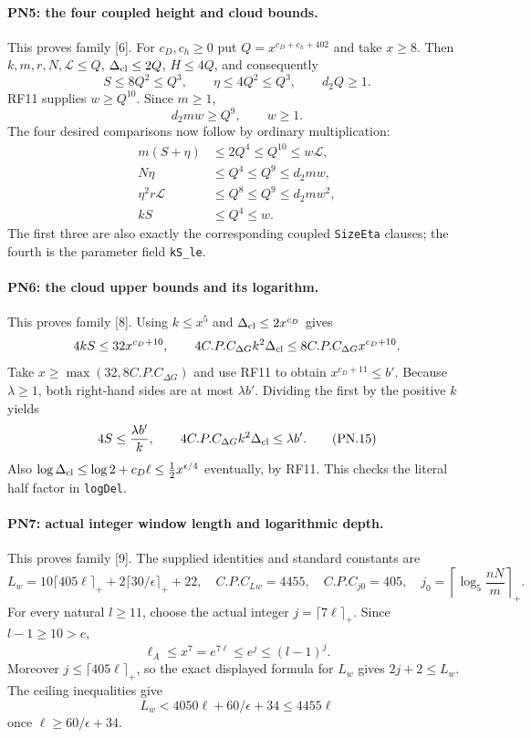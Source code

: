 \paragraph{PN5: the four coupled height and cloud bounds.}
This proves family [6]. For $c_D,c_h\geq0$ put
$Q=x^{c_D+c_h+402}$ and take $x\geq8$.
Then $k,m,r,N,\mathcal L\leq Q$, $\Delta_{\rm cl}\leq2Q$,
$H\leq4Q$, and consequently
\[
 S\leq8Q^2\leq Q^3,\qquad
 \eta\leq4Q^2\leq Q^3,\qquad d_2Q\geq1.
\]
RF11 supplies $w\geq Q^{10}$. Since $m\geq1$,
\[
 d_2mw\geq Q^9,\qquad w\geq1.
\]
The four desired comparisons now follow by ordinary multiplication:
\begin{align*}
 m(S+\eta)&\leq2Q^4\leq Q^{10}\leq w\mathcal L,\\
 N\eta&\leq Q^4\leq Q^9\leq d_2mw,\\
 \eta^2r\mathcal L&\leq Q^8\leq Q^9\leq d_2mw^2,\\
 kS&\leq Q^4\leq w.
                                                               \tag{PN.14}
\end{align*}
The first three are also exactly the corresponding coupled
\texttt{SizeEta} clauses; the fourth is the parameter field
\texttt{kS\_le}.

\paragraph{PN6: the cloud upper bounds and its logarithm.}
This proves family [8]. Using $k\leq x^5$ and
$\Delta_{\rm cl}\leq2x^{c_D}$ gives
\[
 4kS\leq32x^{c_D+10},\qquad
 4C.P.C_{\Delta G}k^2\Delta_{\rm cl}
                       \leq8C.P.C_{\Delta G}x^{c_D+10}.
\]
Take $x\geq\max(32,8C.P.C_{\Delta G})$ and use RF11 to obtain
$x^{c_D+11}\leq b'$. Because $\lambda\geq1$, both right-hand
sides are at most $\lambda b'$. Dividing the first by the positive
$k$ yields
\[
 4S\leq\frac{\lambda b'}k,\qquad
 4C.P.C_{\Delta G}k^2\Delta_{\rm cl}\leq\lambda b'.       \tag{PN.15}
\]
Also
$\log\Delta_{\rm cl}\leq\log2+c_D\ell
\leq\tfrac12x^{\epsilon/4}$ eventually, by RF11.
This checks the literal half factor in \texttt{logDel}.

\paragraph{PN7: actual integer window length and logarithmic depth.}
This proves family [9]. The supplied identities and standard constants
are
\[
 L_w=10\lceil405\ell\rceil_++2\lceil30/\epsilon\rceil_++22,
 \quad C.P.C_{Lw}=4455,\quad C.P.C_{j0}=405,
 \quad j_0=\left\lceil\log_5\frac{nN}{m}\right\rceil_+.
                                                               \tag{PN.16}
\]
For every natural $l\geq11$, choose the actual integer
$j=\lceil7\ell\rceil_+$. Since $l-1\geq10>e$,
\[
 \ell_A\leq x^7=e^{7\ell}\leq e^j\leq(l-1)^j.
\]
Moreover $j\leq\lceil405\ell\rceil_+$, so the exact displayed
formula for $L_w$ gives $2j+2\leq L_w$. The ceiling inequalities give
\[
 L_w<4050\ell+60/\epsilon+34\leq4455\ell
\]
once $\ell\geq60/\epsilon+34$.

